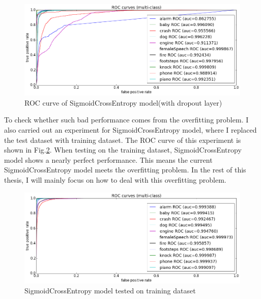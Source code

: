 \begin{figure}[h!]
	\includegraphics[scale=0.4]{../image/chapter2/rocSCE.png}
	\caption{ROC curve of SigmoidCrossEntropy model(with dropout layer)}
	\label{fig:rocSCE}
\end{figure}
\newpage
To check whether such bad performance comes from the overfitting problem. I also carried out an experiment for SigmoidCrossEntropy model, where I replaced the test dataset with training dataset. The ROC curve of this experiment is shown in Fig.\ref{fig:SCEoverfitting}. 
When testing on the training dataset, SigmoidCrossEntropy model shows a nearly perfect performance. This means the current SigmoidCrossEntropy model meets the overfitting problem. In the rest of this thesis, I will mainly focus on how to deal with this overfitting problem.
\begin{figure}[h!]
	\caption{SigmoidCrossEntropy model tested on training dataset}
	\label{fig:SCEoverfitting}
	\includegraphics[scale=0.4]{../image/chapter2/SCEoverfitting.png}
\end{figure}